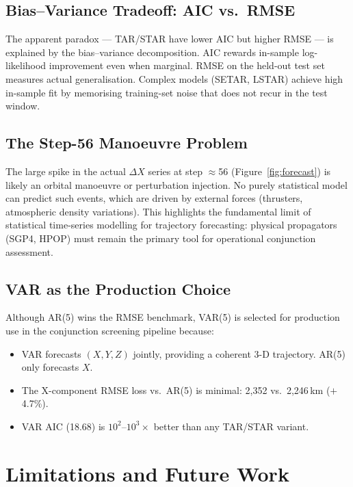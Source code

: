 \documentclass[conference]{IEEEtran}
\begin{document}
\subsection{Bias--Variance Tradeoff: AIC vs.\ RMSE}

The apparent paradox --- TAR/STAR have lower AIC but higher RMSE --- is
explained by the bias--variance decomposition. AIC rewards in-sample
log-likelihood improvement even when marginal. RMSE on the held-out test set
measures actual generalisation. Complex models (SETAR, LSTAR) achieve high
in-sample fit by memorising training-set noise that does not recur in the
test window.

\subsection{The Step-56 Manoeuvre Problem}

The large spike in the actual $\Delta X$ series at step $\approx$56
(Figure~\ref{fig:forecast}) is likely an orbital manoeuvre or perturbation
injection. No purely statistical model can predict such events, which are
driven by external forces (thrusters, atmospheric density variations). This
highlights the fundamental limit of statistical time-series modelling for
trajectory forecasting: physical propagators (SGP4, HPOP) must remain the
primary tool for operational conjunction assessment.

\subsection{VAR as the Production Choice}

Although AR(5) wins the RMSE benchmark, VAR(5) is selected for production
use in the conjunction screening pipeline because:
\begin{itemize}
  \item VAR forecasts $(X, Y, Z)$ jointly, providing a coherent 3-D
        trajectory. AR(5) only forecasts $X$.
  \item The X-component RMSE loss vs.\ AR(5) is minimal:
        2{,}352 vs.\ 2{,}246\,km ($+$4.7\%).
  \item VAR AIC (18.68) is $10^2$--$10^3\times$ better than any TAR/STAR
        variant.
\end{itemize}

\section{Limitations and Future Work}
\label{sec:future}
\end{document}
